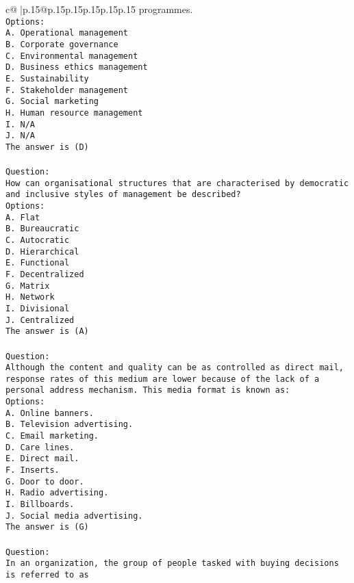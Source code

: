 \documentclass{article}
\begin{document}
{\begin{supertabular}{c@{$\;$}|p{.15\linewidth}@{}p{.15\linewidth}p{.15\linewidth}p{.15\linewidth}p{.15\linewidth}p{.15\linewidth}}
{{{programmes.\\ \tt Options:\\ \tt A. Operational management\\ \tt B. Corporate governance\\ \tt C. Environmental management\\ \tt D. Business ethics management\\ \tt E. Sustainability\\ \tt F. Stakeholder management\\ \tt G. Social marketing\\ \tt H. Human resource management\\ \tt I. N/A\\ \tt J. N/A\\ \tt The answer is (D)\\ \tt \\ \tt Question:\\ \tt How can organisational structures that are characterised by democratic and inclusive styles of management be described?\\ \tt Options:\\ \tt A. Flat\\ \tt B. Bureaucratic\\ \tt C. Autocratic\\ \tt D. Hierarchical\\ \tt E. Functional\\ \tt F. Decentralized\\ \tt G. Matrix\\ \tt H. Network\\ \tt I. Divisional\\ \tt J. Centralized\\ \tt The answer is (A)\\ \tt \\ \tt Question:\\ \tt Although the content and quality can be as controlled as direct mail, response rates of this medium are lower because of the lack of a personal address mechanism. This media format is known as:\\ \tt Options:\\ \tt A. Online banners.\\ \tt B. Television advertising.\\ \tt C. Email marketing.\\ \tt D. Care lines.\\ \tt E. Direct mail.\\ \tt F. Inserts.\\ \tt G. Door to door.\\ \tt H. Radio advertising.\\ \tt I. Billboards.\\ \tt J. Social media advertising.\\ \tt The answer is (G)\\ \tt \\ \tt Question:\\ \tt In an organization, the group of people tasked with buying decisions is referred to as }}}
\end{supertabular}}
\end{document}
